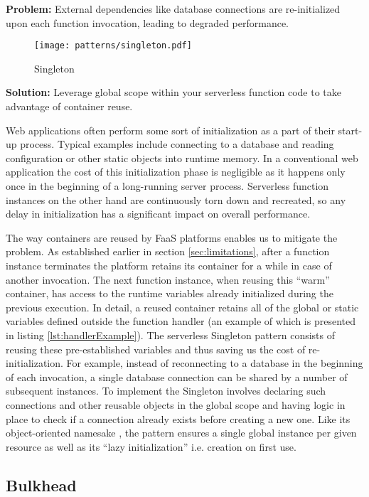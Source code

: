 \textbf{Problem:} External dependencies like database connections are re-initialized upon each function invocation, leading to degraded performance.

\begin{figure}[h]
  \centering
  \texttt{[image: patterns/singleton.pdf]}
  \caption{Singleton}
  \label{fig:singleton}
\end{figure}

\textbf{Solution:} Leverage global scope within your serverless function code to take advantage of container reuse.

Web applications often perform some sort of initialization as a part of their start-up process. Typical examples include connecting to a database and reading configuration or other static objects into runtime memory. In a conventional web application the cost of this initialization phase is negligible as it happens only once in the beginning of a long-running server process. Serverless function instances on the other hand are continuously torn down and recreated, so any delay in initialization has a significant impact on overall performance.

The way containers are reused by FaaS platforms enables us to mitigate the problem. As established earlier in section \ref{sec:limitations}, after a function instance terminates the platform retains its container for a while in case of another invocation. The next function instance, when reusing this ``warm'' container, has access to the runtime variables already initialized during the previous execution. In detail, a reused container retains all of the global or static variables defined outside the function handler (an example of which is presented in listing \ref{lst:handlerExample}). The serverless Singleton pattern consists of reusing these pre-established variables and thus saving us the cost of re-initialization. For example, instead of reconnecting to a database in the beginning of each invocation, a single database connection can be shared by a number of subsequent instances. To implement the Singleton involves declaring such connections and other reusable objects in the global scope and having logic in place to check if a connection already exists before creating a new one. Like its object-oriented namesake \parencite{gamma94designPatterns}, the pattern ensures a single global instance per given resource as well as its ``lazy initialization'' i.e. creation on first use. \parencite{aws18serverlessLens}

\subsection{Bulkhead} \label{subsec:Bulkhead}

